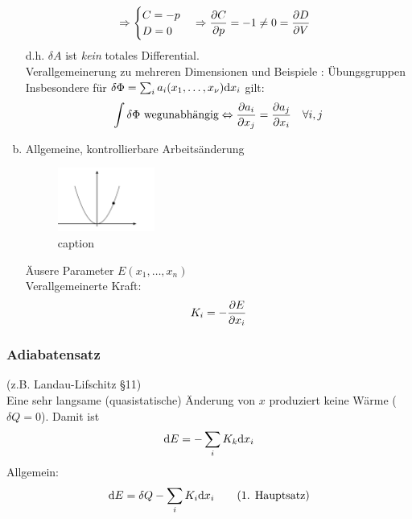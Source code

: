 \begin{enumerate}[a)]
\begin{equation}
\begin{split}
            & \Rightarrow
            \begin{cases}
                C = - p \\
                D = 0
            \end{cases}
            \Rightarrow \frac{\partial C}{\partial p} = -1 \neq 0 = \frac{\partial D}{\partial V}
        \end{split}
    \end{equation}
    d.h. $\delta A$ ist \emph{kein} totales Differential. \\[\baselineskip]
    Verallgemeinerung zu mehreren Dimensionen und Beispiele : Übungsgruppen \\
    Insbesondere für $\delta \Phi = \sum_i a_i (x_1, \ldots, x_\nu) \mathrm{d} x_i$ gilt:
    \begin{equation}
        \int \delta \Phi \text{ wegunabhängig} \Leftrightarrow \frac{\partial a_i}{\partial x_j} = \frac{\partial a_j}{\partial x_i} \quad \forall i, j
    \end{equation}
    \item Allgemeine, kontrollierbare Arbeitsänderung
    \begin{figure}[H]
        \begin{center}
            \includegraphics[width=0.3\textwidth]{../img/controlledDeltaWork.pdf}
            \caption{caption}  %
            \label{img:controlledDeltaWork}
        \end{center}
    \end{figure}
    Äusere Parameter $E(x_1, \ldots, x_n)$ \\
    Verallgemeinerte Kraft:
    \begin{equation}
        K_i = - \frac{\partial E}{\partial x_i}
    \end{equation}
\end{enumerate}
\subsubsection{Adiabatensatz}
(z.B. Landau-Lifschitz §11) \\
Eine sehr langsame (quasistatische) Änderung von $x$ produziert keine Wärme ($\delta Q = 0$). Damit ist 
\begin{equation}
    \mathrm{d} E = - \sum_i K_k \mathrm{d} x_i
\end{equation}
Allgemein:
\begin{equation}
    \mathrm{d} E = \delta Q - \sum_i K_i \mathrm{d} x_i \qquad \text{(1. Hauptsatz)}
\end{equation}

